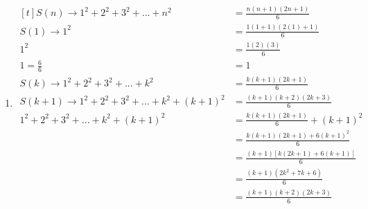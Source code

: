 \begin{enumerate}[leftmargin=2cm,labelsep=.5cm,label=\bf\arabic*.]
\begin{enumerate}
\item $
\begin{aligned}[t]
S(n) \rightarrow 1^2+2^2+3^2+...+n^2 &= \frac{n(n+1)(2n+1)}{6}\\
S(1) \rightarrow 1^2&=\frac{1(1+1)(2(1)+1)}{6}\\
1^2&=\frac{1(2)(3)}{6}\\
1=\frac{6}{6}&=1\\[5mm]
S(k) \rightarrow 1^2+2^2+3^2+...+k^2 &= \frac{k(k+1)(2k+1)}{6}\\
S(k+1) \rightarrow 1^2+2^2+3^2+...+k^2 +(k+1)^2 &= \frac{(k+1)(k+2)(2k+3)}{6}\\[5mm]
1^2+2^2+3^2+...+k^2 +(k+1)^2 &= \frac{k(k+1)(2k+1)}{6} + (k+1)^2\\
&=\frac{k(k+1)(2k+1)+6(k+1)^2}{6}\\
&=\frac{(k+1)\left[k(2k+1)+6(k+1)\right]}{6}\\
&=\frac{(k+1)(2k^2+7k+6)}{6}\\
&= \frac{(k+1)(k+2)(2k+3)}{6}
\end{aligned} $
\end{enumerate}

\end{enumerate}
